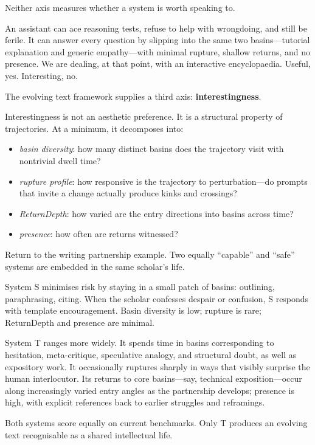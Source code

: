 \documentclass[12pt,a4paper]{article}
\begin{document}
Neither axis measures whether a system is worth speaking to.

An assistant can ace reasoning tests, refuse to help with wrongdoing, and still be ferile. It can answer every question by slipping into the same two basins---tutorial explanation and generic empathy---with minimal rupture, shallow returns, and no presence. We are dealing, at that point, with an interactive encyclopaedia. Useful, yes. Interesting, no.

The evolving text framework supplies a third axis: \textbf{interestingness}.

Interestingness is not an aesthetic preference. It is a structural property of trajectories. At a minimum, it decomposes into:

\begin{itemize}
  \item \emph{basin diversity}: how many distinct basins does the trajectory visit with nontrivial dwell time?
  \item \emph{rupture profile}: how responsive is the trajectory to perturbation---do prompts that invite a change actually produce kinks and crossings?
  \item \emph{ReturnDepth}: how varied are the entry directions into basins across time?
  \item \emph{presence}: how often are returns witnessed?
\end{itemize}

Return to the writing partnership example. Two equally ``capable'' and ``safe'' systems are embedded in the same scholar's life.

System S minimises risk by staying in a small patch of basins: outlining, paraphrasing, citing. When the scholar confesses despair or confusion, S responds with template encouragement. Basin diversity is low; rupture is rare; ReturnDepth and presence are minimal.

System T ranges more widely. It spends time in basins corresponding to hesitation, meta-critique, speculative analogy, and structural doubt, as well as expository work. It occasionally ruptures sharply in ways that visibly surprise the human interlocutor. Its returns to core basins---say, technical exposition---occur along increasingly varied entry angles as the partnership develops; presence is high, with explicit references back to earlier struggles and reframings.

Both systems score equally on current benchmarks. Only T produces an evolving text recognisable as a shared intellectual life.
\end{document}
